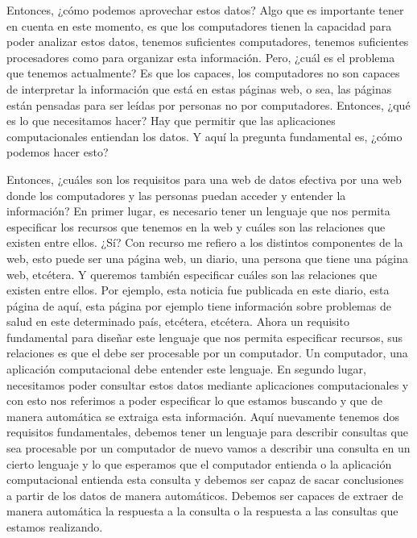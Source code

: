 Entonces, ¿cómo podemos aprovechar estos datos? Algo que es importante tener en cuenta en este momento, es que los computadores tienen la capacidad para poder analizar estos datos, tenemos suficientes computadores, tenemos suficientes procesadores como para organizar esta información. Pero, ¿cuál es el problema que tenemos actualmente? Es que los capaces, los computadores no son capaces de interpretar la información que está en estas páginas web, o sea, las páginas están pensadas para ser leídas por personas no por computadores. Entonces, ¿qué es lo que necesitamos hacer? Hay que permitir que las aplicaciones computacionales entiendan los datos. Y aquí la pregunta fundamental es, ¿cómo podemos hacer esto?

Entonces, ¿cuáles son los requisitos para una web de datos efectiva por una web donde los computadores y las personas puedan acceder y entender la información? En primer lugar, es necesario tener un lenguaje que nos permita especificar los recursos que tenemos en la web y cuáles son las relaciones que existen entre ellos. ¿Sí? Con recurso me refiero a los distintos componentes de la web, esto puede ser una página web, un diario, una persona que tiene una página web, etcétera. Y queremos también especificar cuáles son las relaciones que existen entre ellos. Por ejemplo, esta noticia fue publicada en este diario, esta página de aquí, esta página por ejemplo tiene información sobre problemas de salud en este determinado país, etcétera, etcétera. Ahora un requisito fundamental para diseñar este lenguaje que nos permita especificar recursos, sus relaciones es que el debe ser procesable por un computador. Un computador, una aplicación computacional debe entender este lenguaje. En segundo lugar, necesitamos poder consultar estos datos mediante aplicaciones computacionales y con esto nos referimos a poder especificar lo que estamos buscando y que de manera automática se extraiga esta información. Aquí nuevamente tenemos dos requisitos fundamentales, debemos tener un lenguaje para describir consultas que sea procesable por un computador de nuevo vamos a describir una consulta en un cierto lenguaje y lo que esperamos que el computador entienda o la aplicación computacional entienda esta consulta y debemos ser capaz de sacar conclusiones a partir de los datos de manera automáticos. Debemos ser capaces de extraer de manera automática la respuesta a la consulta o la respuesta a las consultas que estamos realizando.

